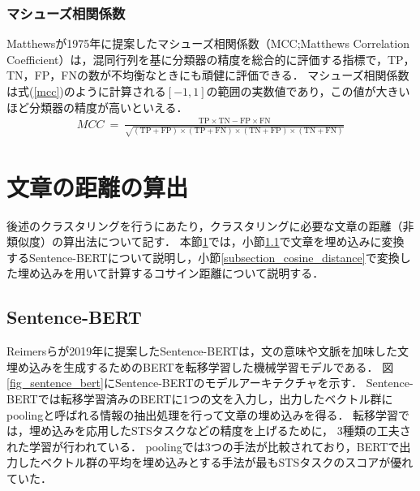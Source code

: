 \documentclass[12pt,a4j,dvipdfmx]{jreport}
\begin{document}
\newpage

\subsubsection{マシューズ相関係数}
\label{subsubsection_mcc}
Matthewsが1975年に提案したマシューズ相関係数（MCC;Matthews Correlation Coefficient）は，混同行列を基に分類器の精度を総合的に評価する指標で，TP，TN，FP，FNの数が不均衡なときにも頑健に評価できる\cite{chicco_advantages_2020}．
マシューズ相関係数は式(\ref{mcc})のように計算される$[-1, 1]$の範囲の実数値であり，この値が大きいほど分類器の精度が高いといえる．
\begin{align}
  MCC ~=~ \frac{\mathrm{TP} \times \mathrm{TN}-\mathrm{FP} \times \mathrm{FN}}{\sqrt{(\mathrm{TP}+\mathrm{FP}) \times(\mathrm{TP}+\mathrm{FN}) \times(\mathrm{TN}+\mathrm{FP}) \times(\mathrm{TN}+\mathrm{FN})}}
  \label{mcc}
\end{align}


\section{文章の距離の算出}
\label{section_sentence_distance}
後述のクラスタリングを行うにあたり，クラスタリングに必要な文章の距離（非類似度）の算出法について記す．
本節\ref{section_sentence_distance}では，小節\ref{subsection_sentence_bert}で文章を埋め込みに変換するSentence-BERTについて説明し，小節\ref{subsection_cosine_distance}で変換した埋め込みを用いて計算するコサイン距離について説明する．

\newpage

\subsection{Sentence-BERT}
\label{subsection_sentence_bert}
Reimersらが2019年に提案したSentence-BERTは，文の意味や文脈を加味した文埋め込みを生成するためのBERTを転移学習した機械学習モデルである\cite{reimers_sentence-bert_2019}．
図\ref{fig_sentence_bert}にSentence-BERTのモデルアーキテクチャを示す．
Sentence-BERTでは転移学習済みのBERTに1つの文を入力し，出力したベクトル群にpoolingと呼ばれる情報の抽出処理を行って文章の埋め込みを得る．
転移学習では，埋め込みを応用したSTSタスクなどの精度を上げるために，
3種類の工夫された学習が行われている．
poolingでは3つの手法が比較されており，BERTで出力したベクトル群の平均を埋め込みとする手法が最もSTSタスクのスコアが優れていた．
\end{document}

